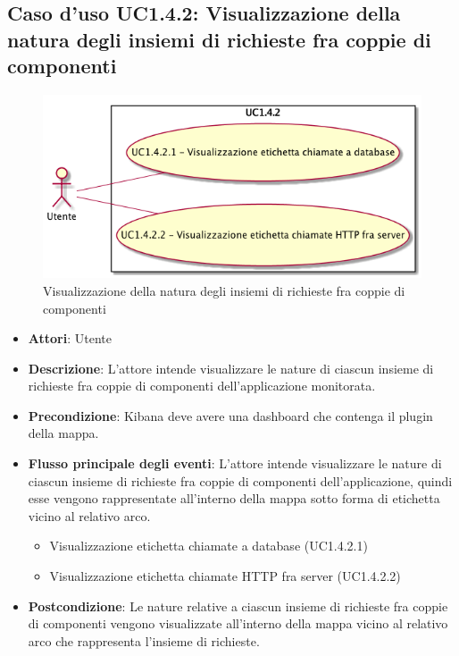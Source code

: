 \subsection{Caso d'uso UC1.4.2: Visualizzazione della natura degli insiemi di richieste fra coppie di componenti}
\begin{figure} [H]
\centering
\includegraphics[scale=0.45]{./UC/UC1-4-2.png}
\caption{Visualizzazione della natura degli insiemi di richieste fra coppie di componenti}\label{}
\end{figure}
\begin{itemize}
\item \textbf{Attori}: Utente
\item \textbf{Descrizione}: L'attore intende visualizzare le nature di ciascun insieme di richieste fra coppie di componenti dell'applicazione monitorata.
\item \textbf{Precondizione}: Kibana deve avere una dashboard che contenga il plugin della mappa.
\item \textbf{Flusso principale degli eventi}: L'attore intende visualizzare le nature di ciascun insieme di richieste fra coppie di componenti dell'applicazione, quindi esse vengono rappresentate all'interno della mappa sotto forma di etichetta vicino al relativo arco.
\begin{itemize}
\item Visualizzazione etichetta chiamate a database (UC1.4.2.1)
\item Visualizzazione etichetta chiamate HTTP fra server (UC1.4.2.2)
\end{itemize}
\item \textbf{Postcondizione}: Le nature relative a ciascun insieme di richieste fra coppie di componenti vengono visualizzate all'interno della mappa vicino al relativo arco che rappresenta l'insieme di richieste.
\end{itemize}
